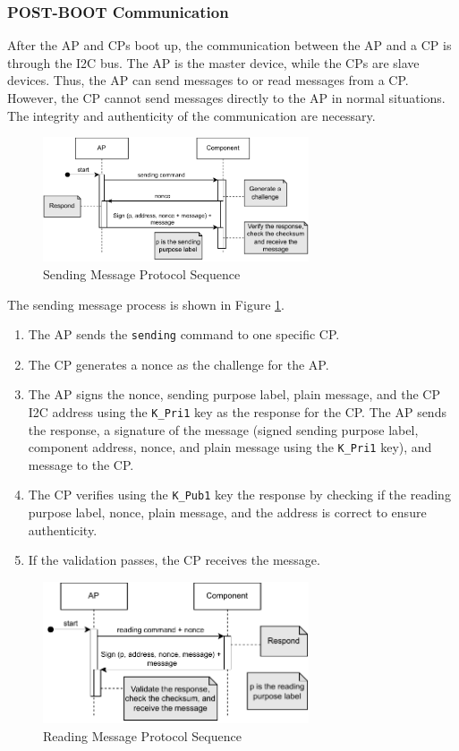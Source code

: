 \documentclass[11pt,oneside,onecolumn,letterpaper]{article}
\begin{document}
	\subsubsection{POST-BOOT Communication}
	After the AP and CPs boot up,
	the communication between the AP and a CP is through the I2C bus.
	The AP is the master device,
	while the CPs are slave devices.
	Thus,
	the AP can send messages to or read messages from a CP.
	However, the CP cannot send messages directly to the AP in normal situations.
	The integrity and authenticity of the communication are necessary.
	
	\begin{figure}[h]
		\centering
		\includegraphics[width=0.7\textwidth]{pics/post1.pdf}
		\caption{Sending Message Protocol Sequence}
		\label{fig:functionality_post1}
	\end{figure}
	
	The sending message process is shown in Figure \ref{fig:functionality_post1}.
	\begin{enumerate}
		\item The AP sends the \texttt{sending} command to one specific CP.
		\item The CP generates a nonce as the challenge for the AP.
		\item The AP signs the nonce,
		sending purpose label,
		plain message,
		and the CP I2C address using the \texttt{K\_Pri1} key as the response for the CP.
		The AP sends the response,
		a signature of the message (signed sending purpose label,
		component address,
		nonce,
		and plain message using the \texttt{K\_Pri1} key),
		and message to the CP.
		\item The CP verifies using the \texttt{K\_Pub1} key the response by checking if the reading purpose label,
		nonce,
		plain message,
		and the address is correct to ensure authenticity.
		\item If the validation passes, the CP receives the message.
	\end{enumerate}
	
	\begin{figure}[h]
		\centering
		\includegraphics[width=0.7\textwidth]{pics/post2.pdf}
		\caption{Reading Message Protocol Sequence}
		\label{fig:functionality_post2}
	\end{figure}
	
\end{document}
